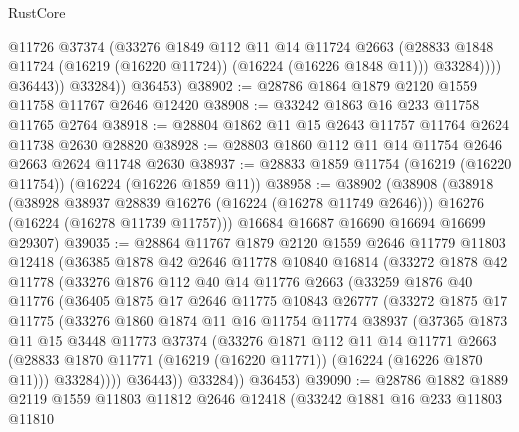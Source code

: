 \begin{lexlean}{RustCore}
\begin{coremodule}
                    @11726
                    @37374
                    (@33276
                      @1849
                      @112
                      @11
                      @14
                      @11724
                      @2663
                      (@28833 @1848 @11724 (@16219 (@16220 @11724)) (@16224 (@16226 @1848 @11)))
                      @33284))))
              @36443))
          @33284))
      @36453)
@38902 := @28786 @1864 @1879 @2120 @1559 @11758 @11767 @2646 @12420
@38908 := @33242 @1863 @16 @233 @11758 @11765 @2764
@38918 := @28804 @1862 @11 @15 @2643 @11757 @11764 @2624 @11738 @2630 @28820
@38928 := @28803 @1860 @112 @11 @14 @11754 @2646 @2663 @2624 @11748 @2630
@38937 := @28833 @1859 @11754 (@16219 (@16220 @11754)) (@16224 (@16226 @1859 @11))
@38958 := @38902
    (@38908
      (@38918
        (@38928 @38937 @28839 @16276 (@16224 (@16278 @11749 @2646)))
        @16276
        (@16224 (@16278 @11739 @11757)))
      @16684
      @16687
      @16690
      @16694
      @16699
      @29307)
@39035 := @28864
    @11767
    @1879
    @2120
    @1559
    @2646
    @11779
    @11803
    @12418
    (@36385
      @1878
      @42
      @2646
      @11778
      @10840
      @16814
      (@33272
        @1878
        @42
        @11778
        (@33276
          @1876
          @112
          @40
          @14
          @11776
          @2663
          (@33259
            @1876
            @40
            @11776
            (@36405
              @1875
              @17
              @2646
              @11775
              @10843
              @26777
              (@33272
                @1875
                @17
                @11775
                (@33276
                  @1860
                  @1874
                  @11
                  @16
                  @11754
                  @11774
                  @38937
                  (@37365
                    @1873
                    @11
                    @15
                    @3448
                    @11773
                    @37374
                    (@33276
                      @1871
                      @112
                      @11
                      @14
                      @11771
                      @2663
                      (@28833 @1870 @11771 (@16219 (@16220 @11771)) (@16224 (@16226 @1870 @11)))
                      @33284))))
              @36443))
          @33284))
      @36453)
@39090 := @28786
    @1882
    @1889
    @2119
    @1559
    @11803
    @11812
    @2646
    @12418
    (@33242
      @1881
      @16
      @233
      @11803
      @11810

\end{coremodule}
\end{lexlean}
